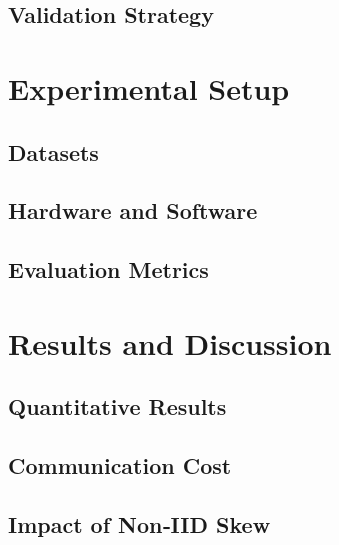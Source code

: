 \subsection{Validation Strategy}

\section{Experimental Setup}
\label{sec:setup}
\subsection{Datasets}

\subsection{Hardware and Software}

\subsection{Evaluation Metrics}

\section{Results and Discussion}
\label{sec:results}
\subsection{Quantitative Results}

\subsection{Communication Cost}

\subsection{Impact of Non‑IID Skew}

